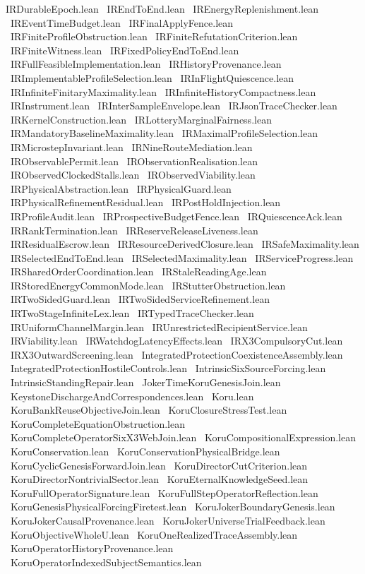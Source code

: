 IRDurableEpoch.lean \
IREndToEnd.lean \
IREnergyReplenishment.lean \
IREventTimeBudget.lean \
IRFinalApplyFence.lean \
IRFiniteProfileObstruction.lean \
IRFiniteRefutationCriterion.lean \
IRFiniteWitness.lean \
IRFixedPolicyEndToEnd.lean \
IRFullFeasibleImplementation.lean \
IRHistoryProvenance.lean \
IRImplementableProfileSelection.lean \
IRInFlightQuiescence.lean \
IRInfiniteFinitaryMaximality.lean \
IRInfiniteHistoryCompactness.lean \
IRInstrument.lean \
IRInterSampleEnvelope.lean \
IRJsonTraceChecker.lean \
IRKernelConstruction.lean \
IRLotteryMarginalFairness.lean \
IRMandatoryBaselineMaximality.lean \
IRMaximalProfileSelection.lean \
IRMicrostepInvariant.lean \
IRNineRouteMediation.lean \
IRObservablePermit.lean \
IRObservationRealisation.lean \
IRObservedClockedStalls.lean \
IRObservedViability.lean \
IRPhysicalAbstraction.lean \
IRPhysicalGuard.lean \
IRPhysicalRefinementResidual.lean \
IRPostHoldInjection.lean \
IRProfileAudit.lean \
IRProspectiveBudgetFence.lean \
IRQuiescenceAck.lean \
IRRankTermination.lean \
IRReserveReleaseLiveness.lean \
IRResidualEscrow.lean \
IRResourceDerivedClosure.lean \
IRSafeMaximality.lean \
IRSelectedEndToEnd.lean \
IRSelectedMaximality.lean \
IRServiceProgress.lean \
IRSharedOrderCoordination.lean \
IRStaleReadingAge.lean \
IRStoredEnergyCommonMode.lean \
IRStutterObstruction.lean \
IRTwoSidedGuard.lean \
IRTwoSidedServiceRefinement.lean \
IRTwoStageInfiniteLex.lean \
IRTypedTraceChecker.lean \
IRUniformChannelMargin.lean \
IRUnrestrictedRecipientService.lean \
IRViability.lean \
IRWatchdogLatencyEffects.lean \
IRX3CompulsoryCut.lean \
IRX3OutwardScreening.lean \
IntegratedProtectionCoexistenceAssembly.lean \
IntegratedProtectionHostileControls.lean \
IntrinsicSixSourceForcing.lean \
IntrinsicStandingRepair.lean \
JokerTimeKoruGenesisJoin.lean \
KeystoneDischargeAndCorrespondences.lean \
Koru.lean \
KoruBankReuseObjectiveJoin.lean \
KoruClosureStressTest.lean \
KoruCompleteEquationObstruction.lean \
KoruCompleteOperatorSixX3WebJoin.lean \
KoruCompositionalExpression.lean \
KoruConservation.lean \
KoruConservationPhysicalBridge.lean \
KoruCyclicGenesisForwardJoin.lean \
KoruDirectorCutCriterion.lean \
KoruDirectorNontrivialSector.lean \
KoruEternalKnowledgeSeed.lean \
KoruFullOperatorSignature.lean \
KoruFullStepOperatorReflection.lean \
KoruGenesisPhysicalForcingFiretest.lean \
KoruJokerBoundaryGenesis.lean \
KoruJokerCausalProvenance.lean \
KoruJokerUniverseTrialFeedback.lean \
KoruObjectiveWholeU.lean \
KoruOneRealizedTraceAssembly.lean \
KoruOperatorHistoryProvenance.lean \
KoruOperatorIndexedSubjectSemantics.lean \
